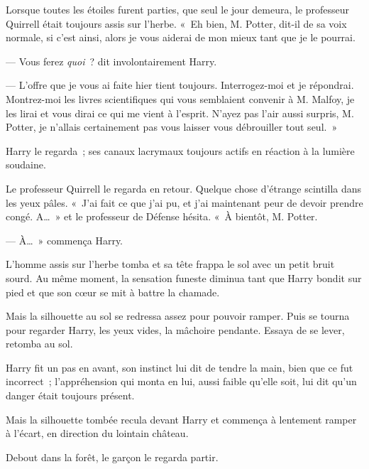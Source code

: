 Lorsque toutes les étoiles furent parties, que seul le jour demeura, le professeur Quirrell était toujours assis sur l'herbe.
«~Eh bien, M. Potter, dit-il de sa voix normale, si c'est ainsi, alors je vous aiderai de mon mieux tant que je le pourrai.

--- Vous ferez \emph{quoi}~? dit involontairement Harry.

--- L'offre que je vous ai faite hier tient toujours.
Interrogez-moi et je répondrai.
Montrez-moi les livres scientifiques qui vous semblaient convenir à M. Malfoy, je les lirai et vous dirai ce qui me vient à l'esprit.
N'ayez pas l'air aussi surpris, M. Potter, je n'allais certainement pas vous laisser vous débrouiller tout seul.~»

Harry le regarda~; ses canaux lacrymaux toujours actifs en réaction à la lumière soudaine.

Le professeur Quirrell le regarda en retour.
Quelque chose d'étrange scintilla dans les yeux pâles.
«~J'ai fait ce que j'ai pu, et j'ai maintenant peur de devoir prendre congé.
A…~» et le professeur de Défense hésita.
«~À bientôt, M. Potter.

--- À…~» commença Harry.

L'homme assis sur l'herbe tomba et sa tête frappa le sol avec un petit bruit sourd.
Au même moment, la sensation funeste diminua tant que Harry bondit sur pied et que son cœur se mit à battre la chamade.

Mais la silhouette au sol se redressa assez pour pouvoir ramper.
Puis se tourna pour regarder Harry, les yeux vides, la mâchoire pendante.
Essaya de se lever, retomba au sol.

Harry fit un pas en avant, son instinct lui dit de tendre la main, bien que ce fut incorrect~; l'appréhension qui monta en lui, aussi faible qu'elle soit, lui dit qu'un danger était toujours présent.

Mais la silhouette tombée recula devant Harry et commença à lentement ramper à l'écart, en direction du lointain château.

Debout dans la forêt, le garçon le regarda partir.
